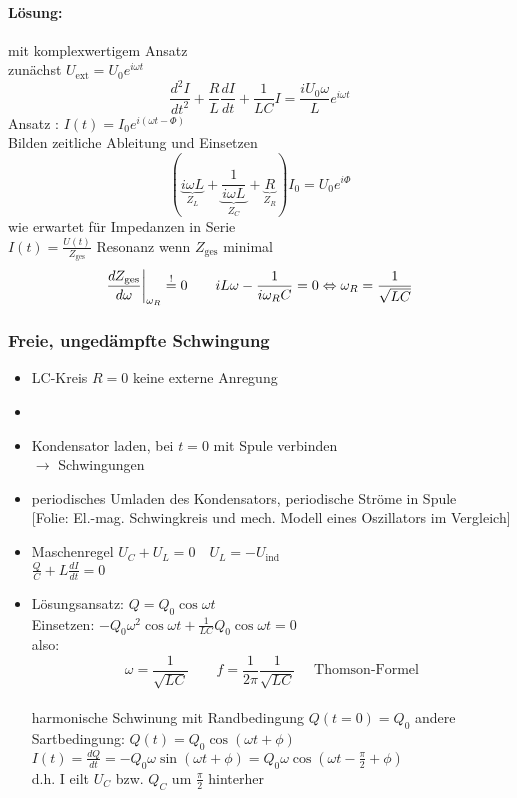 \documentclass[titlepage,12pt,a4paper,ngerman]{report}
\newcommand{\tx}[1]{\textrm{#1}}
\newcommand{\ub}[1]{\underbrace{#1}}
\newcommand{\uind}{U_{\tx{ind}}}
\newcommand{\folie}[1]{\color{gray}[Folie: #1]\color{black}}
\begin{document}
\paragraph{Lösung:} mit komplexwertigem Ansatz\\
zunächst $ U_{\tx{ext}} = U_0 e^{i\omega t} $
$$ \frac{d^2 I}{dt^2} + \frac{R}{L} \frac{dI}{dt} + \frac{1}{LC} I = \frac{i U_0 \omega}{L} e ^{i \omega t}$$
Ansatz : $ I(t) = I_0 e ^{i(\omega t - \Phi)} $\\
Bilden zeitliche Ableitung und Einsetzen
$$ (\ub{i \omega L}_{Z_L} + \ub{\frac{1}{i \omega L}}_{Z_C} + \ub{R}_{Z_R} ) I_0 = U_0 e ^{i \Phi} $$
 wie erwartet für Impedanzen in Serie\\
 $ I(t) = \frac{U(t)}{Z_{\tx{ges}}} $ Resonanz wenn $ Z_{\tx{ges}} $ minimal
 $$\frac{d Z_{\tx{ges}}}{d \omega} \bigg|_{\omega_R} \buildrel ! \over = 0 \qquad i L \omega - \frac{1}{i \omega_R C} = 0 \Leftrightarrow \omega_R = \frac{1}{\sqrt{LC}}$$
 
 
 \subsubsection{Freie, ungedämpfte Schwingung}
 \begin{itemize}
 	\item LC-Kreis $ R = 0 $ keine externe Anregung
 	\item \item Kondensator laden, bei $ t=0 $ mit Spule verbinden\\
 	$ \rightarrow $ Schwingungen
 	\item periodisches Umladen des Kondensators, periodische Ströme in Spule\\
 	\folie{El.-mag. Schwingkreis und mech. Modell eines Oszillators im Vergleich}
 	\item Maschenregel $ U_C+U_L = 0 \quad U_L = -\uind $\\
 	$ \frac{Q}{C} + L \frac{dI}{dt} = 0 $
 	\item Lösungsansatz: $ Q = Q_0 \cos \omega t $\\
 	Einsetzen: $ -Q_0 \omega^2 \cos \omega t + \frac{1}{LC} Q_0 \cos \omega t = 0 $\\
 	also: $$\boxed{\omega = \frac{1}{\sqrt{LC}} \qquad f = \frac{1}{2 \pi} \frac{1}{\sqrt{LC}} } \quad \tx{ Thomson-Formel}$$\\
 	harmonische Schwinung mit Randbedingung $ Q(t=0)= Q_0 $ andere Sartbedingung: $ Q(t) = Q_0 \cos(\omega t + \phi) $\\
 	$ I(t) = \frac{dQ}{dt} = - Q_0 \omega \sin(\omega t + \phi) = Q_0 \omega \cos (\omega t - \frac{\pi}{2} + \phi) $\\
 	d.h. I eilt $ U_C $ bzw. $ Q_C $ um $\frac{\pi}{2}$ hinterher
 \end{itemize}
\end{document}
